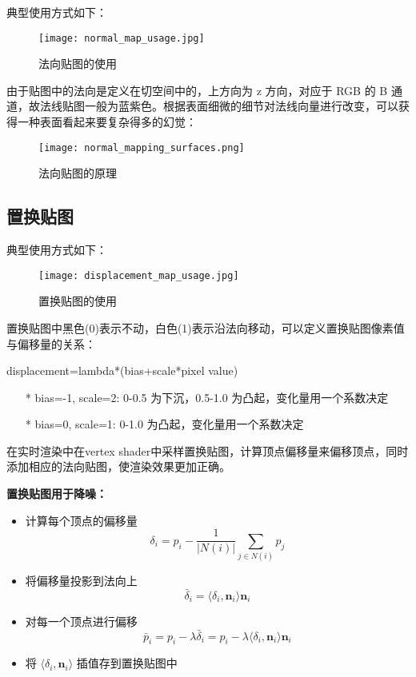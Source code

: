 \documentclass[14pt]{scrartcl} %
\begin{document}
典型使用方式如下：

\begin{figure}[h] %
	\centering
	\texttt{[image: normal\_map\_usage.jpg]} %
	\caption{法向贴图的使用}
\end{figure}
由于贴图中的法向是定义在切空间中的，上方向为 z 方向，对应于 RGB 的 B 通道，故法线贴图一般为蓝紫色。根据表面细微的细节对法线向量进行改变，可以获得一种表面看起来要复杂得多的幻觉：
\begin{figure}[h] %
	\centering
	\texttt{[image: normal\_mapping\_surfaces.png]} %
	\caption{法向贴图的原理}
\end{figure}

\pagebreak
\subsection{置换贴图}
典型使用方式如下：
\begin{figure}[h] %
	\centering
	\texttt{[image: displacement\_map\_usage.jpg]} %
	\caption{置换贴图的使用}
\end{figure}

置换贴图中黑色(0)表示不动，白色(1)表示沿法向移动，可以定义置换贴图像素值与偏移量的关系：

displacement=lambda*(bias+scale*pixel value)
\begin{itemize}
	\item [*] bias=-1, scale=2: 0-0.5 为下沉，0.5-1.0 为凸起，变化量用一个系数决定
	\item [*] bias=0, scale=1: 0-1.0 为凸起，变化量用一个系数决定
\end{itemize}

在实时渲染中在vertex shader中采样置换贴图，计算顶点偏移量来偏移顶点，同时添加相应的法向贴图，使渲染效果更加正确。

\textbf{置换贴图用于降噪：}
\begin{itemize}
	\item 计算每个顶点的偏移量
	\begin{equation}
	\delta_i=p_i-\frac{1}{|N(i)|}\sum\limits_{j\in N(i)}p_j
	\end{equation}
	\item 将偏移量投影到法向上
	\begin{equation}
	\bar{\delta}_i=\langle\delta_i,\pmb{n}_i\rangle \pmb{n}_i
	\end{equation}
	\item 对每一个顶点进行偏移
	\begin{equation}
	\bar{p}_i=p_i-\lambda \bar{\delta}_i=p_i-\lambda\langle\delta_i,\pmb{n}_i\rangle \pmb{n}_i
	\end{equation}
	\item 将 $\langle\delta_i,\pmb{n}_i\rangle$ 插值存到置换贴图中
\end{itemize}
\end{document}
